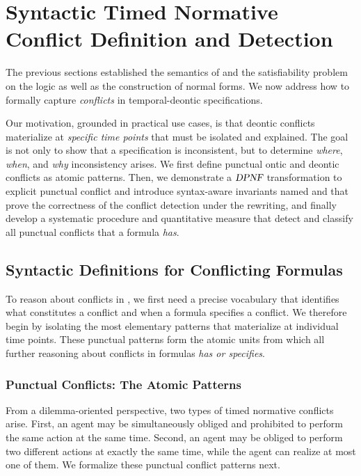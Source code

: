 \section{Syntactic Timed Normative Conflict Definition and Detection}
\label{sec:conflicts}

The previous sections established the semantics of \TDDLfm and the satisfiability problem on the logic as well as the construction of normal forms. We now address how to formally capture \emph{conflicts} in temporal-deontic specifications.

Our motivation, grounded in practical use cases, is that deontic conflicts materialize at \emph{specific time points} that must be isolated and explained. The goal is not only to show that a specification is inconsistent, but to determine \emph{where}, \emph{when}, and \emph{why} inconsistency arises. We first define punctual ontic and deontic conflicts as atomic patterns.  Then, we demonstrate a $\textsl{DPNF}$ transformation to explicit punctual conflict and introduce syntax-aware invariants named \LUCO and \LAP that prove the correctness of the conflict detection under the \dpnf rewriting, and finally develop a systematic procedure and quantitative measure that detect and classify all punctual conflicts that a formula \emph{has}.



\subsection{Syntactic Definitions for Conflicting Formulas}
To reason about conflicts in \TDDLfm, we first need a precise vocabulary that identifies what constitutes a conflict and when a formula specifies a conflict. We therefore begin by isolating the most elementary patterns that materialize at individual time points. These punctual patterns form the atomic units from which all further reasoning about conflicts in formulas \emph{has or specifies}.

\subsubsection{Punctual Conflicts: The Atomic Patterns}
From a dilemma-oriented perspective, two types of timed normative conflicts arise. First, an agent may be simultaneously obliged and prohibited to perform the same action at the same time. Second, an agent may be obliged to perform two different actions at exactly the same time, while the agent can realize at most one of them. We formalize these punctual conflict patterns next.

